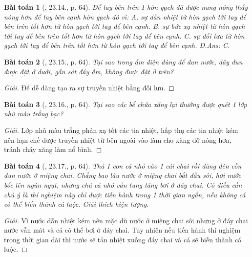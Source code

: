 \documentclass{article}
\newtheorem{baitoan}{Bài toán}
\begin{document}
\begin{baitoan}[\cite{SBT_Vat_Ly_8}, 23.14., p. 64]
	Để tay bên trên 1 hòn gạch đã được nung nóng thấy nóng hơn để tay bên cạnh hòn gạch đó vì: {\sf A.} sự dẫn nhiệt từ hòn gạch tới tay để bên trên tốt hơn từ hòn gạch tới tay để bên cạnh. {\sf B.} sự bức xạ nhiệt từ hòn gạch tới tay để bên trên tốt hơn từ hòn gạch tới tay để bên cạnh. {\sf C.} sự đối lưu từ hòn gạch tới tay để bên trên tốt hơn từ hòn gạch tới tay để bên cạnh. {\sf D.}\hfill{\sf Ans: C.}
\end{baitoan}

\begin{baitoan}[\cite{SBT_Vat_Ly_8}, 23.15., p. 64]
	Tại sao trong ấm điện dùng để đun nước, dây đun được đặt ở dưới, gần sát đáy ấm, không được đặt ở trên?
\end{baitoan}

\begin{proof}[Giải]
	Để dễ dàng tạo ra sự truyền nhiệt bằng đối lưu.
\end{proof}

\begin{baitoan}[\cite{SBT_Vat_Ly_8}, 23.16., p. 64]
	Tại sao các bể chứa xăng lại thường được quét 1 lớp nhũ màu trắng bạc?
\end{baitoan}

\begin{proof}[Giải]
	Lớp nhũ màu trắng phản xạ tốt các tia nhiệt, hấp thụ các tia nhiệt kém nên hạn chế được truyền nhiệt từ bên ngoài vào làm cho xăng đỡ nóng hơn, tránh cháy xăng làm nổ bình.
\end{proof}

\begin{baitoan}[\cite{SBT_Vat_Ly_8}, 23.17., p. 64]
	Thả 1 con cá nhỏ vào 1 cái chai rồi dùng đèn cồn đun nước ở miệng chai. Chẳng bao lâu nước ở miệng chai bắt đầu sôi, hơi nước bốc lên ngùn ngụt, nhưng chú cá nhỏ vẫn tung tăng bơi ở đáy chai. Có điều cần chú ý là thí nghiệm này chỉ được tiến hành trong 1 thời gian ngắn, nếu không cá có thể biến thành cá luộc. Giải thích hiện tượng.
\end{baitoan}

\begin{proof}[Giải]
	Vì nước dẫn nhiệt kém nên mặc dù nước ở miệng chai sôi nhưng ở đáy chai nước vẫn mát và cá có thể bơi ở đáy chai. Tuy nhiên nếu tiến hành thí nghiệm trong thời gian dài thì nước sẽ tản nhiệt xuống đáy chai và cá sẽ biến thành cá luộc.
\end{proof}

\end{document}
